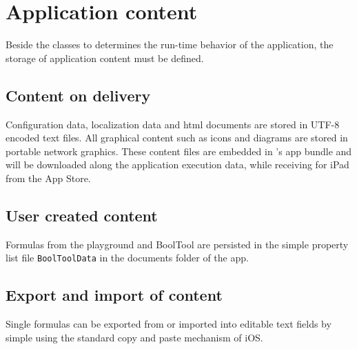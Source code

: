 \section{Application content}

Beside the classes to determines the run-time behavior of the application,
the storage of application content must be defined.

\subsection{Content on delivery}

Configuration data, localization data and html documents
are stored in UTF-8 encoded text files.
All graphical content such as icons and diagrams are stored in portable network graphics.
These content files are embedded in \Nyaya's app bundle
and will be downloaded along the application execution data,
while receiving \Nyaya for iPad from the App Store.

\subsection{User created content}

Formulas from the playground and BoolTool are persisted 
in the simple property list file \verb+BoolToolData+ 
in the documents folder of the app.

\subsection{Export and import of content}

Single formulas can be exported from or imported into editable text fields 
by simple using the standard copy and paste mechanism of iOS.




